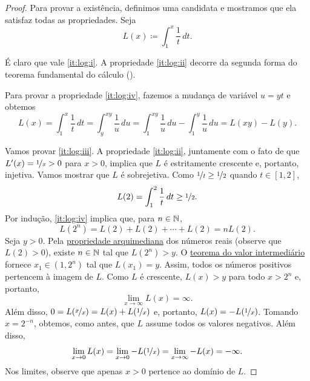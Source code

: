 \begin{proof}
Para provar a existência, definimos uma candidata e mostramos que ela satisfaz
todas as propriedades. Seja
\begin{equation*}
L(x) \coloneqq \int_1^x \frac{1}{t}\,dt .
\end{equation*}

É claro que vale \ref{it:log:i}. A propriedade \ref{it:log:ii} decorre
da segunda forma do teorema fundamental do cálculo
().

Para provar a propriedade \ref{it:log:iv},
fazemos a mudança de variável $u=yt$ e obtemos
\begin{equation*}
L(x) =
\int_1^{x} \frac{1}{t}\,dt
=
\int_y^{xy} \frac{1}{u}\,du
=
\int_1^{xy} \frac{1}{u}\,du
-
\int_1^{y} \frac{1}{u}\,du
=
L(xy)-L(y) .
\end{equation*}

Vamos provar \ref{it:log:iii}.
A propriedade \ref{it:log:ii}, juntamente com o fato de que
$L'(x) = \nicefrac{1}{x} > 0$ para $x > 0$, implica que $L$
é estritamente crescente e, portanto, injetiva.
Vamos mostrar que $L$ é sobrejetiva.
Como $\nicefrac{1}{t} \geq \nicefrac{1}{2}$ quando $t \in [1,2]$,
\begin{equation*}
L(2) = \int_1^2 \frac{1}{t} \,dt \geq \nicefrac{1}{2} .
\end{equation*}
Por indução, \ref{it:log:iv} implica que, para $n \in {\mathbb{N}}$,
\begin{equation*}
L(2^n) = L(2) + L(2) + \cdots + L(2) = n L(2) .
\end{equation*}
Seja $y > 0$.
Pela \hyperref[thm:arch:i]{propriedade arquimediana} dos números reais
(observe que $L(2) > 0$), existe $n \in {\mathbb{N}}$ tal que
$L(2^n) > y$. O
\hyperref[IVT:thm]{teorema do valor intermediário}
fornece $x_1 \in (1,2^n)$ tal que $L(x_1) = y$. Assim,
todos os números positivos pertencem à imagem de $L$.
Como $L$ é crescente, $L(x) > y$ para todo $x > 2^n$ e, portanto,
\begin{equation*}
\lim_{x\to\infty} L(x) = \infty .
\end{equation*}
Além disso,
$0 = L(\nicefrac{x}{x}) = L(x) + L(\nicefrac{1}{x})$ e, portanto,
$L(x) = - L(\nicefrac{1}{x})$. Tomando $x=2^{-n}$, obtemos,
como antes, que $L$ assume todos os valores negativos. Além disso,
\begin{equation*}
\lim_{x \to 0} L(x) = 
\lim_{x \to 0} -L(\nicefrac{1}{x})
=
\lim_{x \to \infty} -L(x)
=  - \infty .
\end{equation*}
Nos limites, observe que apenas $x > 0$ pertence ao domínio de $L$.


\end{proof}
